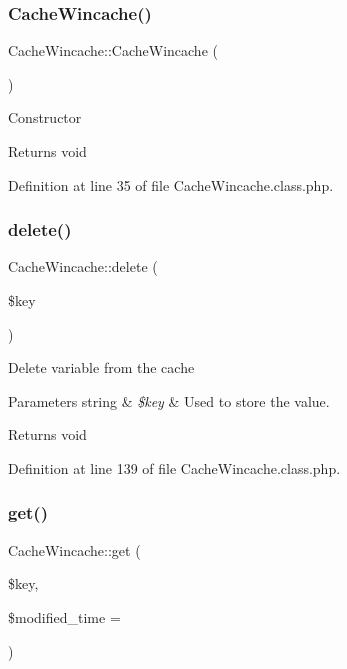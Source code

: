 \subsubsection{\texorpdfstring{Cache\+Wincache()}{CacheWincache()}}
{\footnotesize\ttfamily Cache\+Wincache\+::\+Cache\+Wincache (\begin{DoxyParamCaption}{ }\end{DoxyParamCaption})}

Constructor

\begin{DoxyReturn}{Returns}
void 
\end{DoxyReturn}


Definition at line 35 of file Cache\+Wincache.\+class.\+php.

\mbox{\label{classCacheWincache_ae7bfddf70b319e76b50f06d50ec720a2}} 
\subsubsection{\texorpdfstring{delete()}{delete()}}
{\footnotesize\ttfamily Cache\+Wincache\+::delete (\begin{DoxyParamCaption}\item[{}]{\$key }\end{DoxyParamCaption})}

Delete variable from the cache


\begin{DoxyParams}[1]{Parameters}
string & {\em \$key} & Used to store the value. \\
\hline
\end{DoxyParams}
\begin{DoxyReturn}{Returns}
void 
\end{DoxyReturn}


Definition at line 139 of file Cache\+Wincache.\+class.\+php.

\mbox{\label{classCacheWincache_a36123121cdf50235b64929c3a13b596b}} 
\subsubsection{\texorpdfstring{get()}{get()}}
{\footnotesize\ttfamily Cache\+Wincache\+::get (\begin{DoxyParamCaption}\item[{}]{\$key,  }\item[{}]{\$modified\+\_\+time = {} }\end{DoxyParamCaption})}

